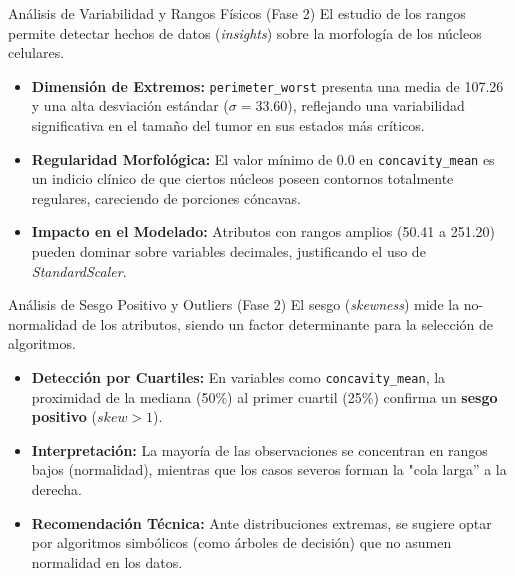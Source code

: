 \documentclass{beamer}
\begin{document}
	\begin{frame}{Análisis de Variabilidad y Rangos Físicos (Fase 2)}
		El estudio de los rangos permite detectar hechos de datos (\textit{insights}) sobre la morfología de los núcleos celulares.
		
		\begin{itemize}
			\item<2-> \textbf{Dimensión de Extremos:} \texttt{perimeter\_worst} presenta una media de 107.26 y una alta desviación estándar ($\sigma=33.60$), reflejando una variabilidad significativa en el tamaño del tumor en sus estados más críticos.
			\item<3-> \textbf{Regularidad Morfológica:} El valor mínimo de 0.0 en \texttt{concavity\_mean} es un indicio clínico de que ciertos núcleos poseen contornos totalmente regulares, careciendo de porciones cóncavas.
			\item<4-> \textbf{Impacto en el Modelado:} Atributos con rangos amplios (50.41 a 251.20) pueden dominar sobre variables decimales, justificando el uso de \textit{StandardScaler}.
		\end{itemize}
	\end{frame}
	
	\begin{frame}{Análisis de Sesgo Positivo y Outliers (Fase 2)}
		El sesgo (\textit{skewness}) mide la no-normalidad de los atributos, siendo un factor determinante para la selección de algoritmos.
		
		\begin{itemize}
			\item<2-> \textbf{Detección por Cuartiles:} En variables como \texttt{concavity\_mean}, la proximidad de la mediana (50\%) al primer cuartil (25\%) confirma un \textbf{sesgo positivo} ($skew > 1$).
			\item<3-> \textbf{Interpretación:} La mayoría de las observaciones se concentran en rangos bajos (normalidad), mientras que los casos severos forman la "cola larga'' a la derecha.
			\item<4-> \textbf{Recomendación Técnica:} Ante distribuciones extremas, se sugiere optar por algoritmos simbólicos (como árboles de decisión) que no asumen normalidad en los datos.
		\end{itemize}
	\end{frame}
	
\end{document}
